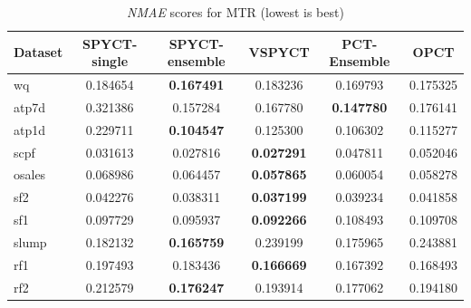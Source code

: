 \documentclass[3p,review,authoryear]{elsarticle}
\begin{document}
\begin{table}[h!]
\centering
\caption{\textit{NMAE} scores for MTR (lowest is best)}
\label{tab:regression_results}
\begin{tabular}{@{}lccccc@{}}
\toprule
Dataset & SPYCT-single & SPYCT-ensemble & VSPYCT & PCT-Ensemble & OPCT \\ \midrule
wq       & 0.184654 & \textbf{0.167491} & 0.183236 & 0.169793 & 0.175325 \\
atp7d    & 0.321386 & 0.157284 & 0.167780 & \textbf{0.147780} & 0.176141 \\
atp1d    & 0.229711 & \textbf{0.104547} & 0.125300 & 0.106302 & 0.115277 \\
scpf     & 0.031613 & 0.027816 & \textbf{0.027291} & 0.047811 & 0.052046 \\
osales   & 0.068986 & 0.064457 & \textbf{0.057865} & 0.060054 & 0.058278 \\
sf2      & 0.042276 & 0.038311 & \textbf{0.037199} & 0.039234 & 0.041858 \\
sf1      & 0.097729 & 0.095937 & \textbf{0.092266} & 0.108493 & 0.109708 \\
slump    & 0.182132 & \textbf{0.165759} & 0.239199 & 0.175965 & 0.243881 \\
rf1      & 0.197493 & 0.183436 & \textbf{0.166669} & 0.167392 & 0.168493 \\
rf2      & 0.212579 & \textbf{0.176247} & 0.193914 & 0.177062 & 0.194180 \\
\bottomrule
\end{tabular}
\end{table}
\end{document}
